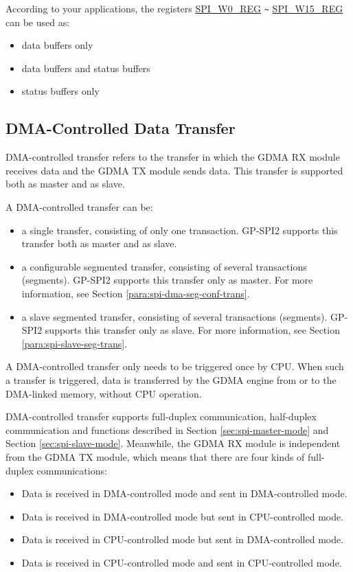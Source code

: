 \documentclass[main\_\_EN.tex]{subfiles}
\begin{document}
According to your applications, the registers \hyperref[regdesc:SPIW0REG]{SPI\_W0\_REG} \verb+~+ \hyperref[regdesc:SPIW0REG]{SPI\_W15\_REG} can be used as:
\begin{itemize}
    \item data buffers only
    \item data buffers and status buffers
    \item status buffers only
\end{itemize}

\subsection{DMA-Controlled Data Transfer}\label{sec:spi-dma-controlled-data-transfer}

DMA-controlled transfer refers to the transfer in which the GDMA RX module receives data and the GDMA TX module sends data. This transfer is supported both as master and as slave.

A DMA-controlled transfer can be:

\begin{itemize}
    \item a single transfer, consisting of only one transaction. GP-SPI2 supports this transfer both as master and as slave.
    \item a configurable segmented transfer, consisting of several transactions (segments). GP-SPI2 supports this transfer only as master. For more information, see Section \ref{para:spi-dma-seg-conf-trans}.
    \item a slave segmented transfer, consisting of several transactions (segments). GP-SPI2 supports this transfer only as slave. For more information, see Section \ref{para:spi-slave-seg-trans}.
\end{itemize}

A DMA-controlled transfer only needs to be triggered once by CPU. When such a transfer is triggered, data is transferred by the GDMA engine from or to the DMA-linked memory, without CPU operation.

DMA-controlled transfer supports full-duplex communication, half-duplex communication and functions described in Section \ref{sec:spi-master-mode} and Section \ref{sec:spi-slave-mode}. Meanwhile, the GDMA RX module is independent from the GDMA TX module, which means that there are four kinds of full-duplex communications:

\begin{itemize}
    \item Data is received in DMA-controlled mode and sent in DMA-controlled mode.

    \item Data is received in DMA-controlled mode but sent in CPU-controlled mode.

    \item Data is received in CPU-controlled mode but sent in DMA-controlled mode.

    \item Data is received in CPU-controlled mode and sent in CPU-controlled mode.

\end{itemize}
\end{document}
